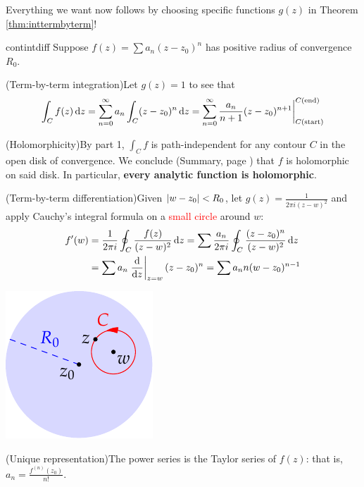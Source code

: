 \goodbreak


Everything we want now follows by choosing specific functions $g(z)$ in Theorem \ref{thm:inttermbyterm}!

\begin{cor}{}{contintdiff}
	Suppose $f(z)=\sum a_n(z-z_0)^n$ has positive radius of convergence $R_0$.
	\begin{enumerate}\itemsep0pt
	  \item (Term-by-term integration)\quad Let $g(z)=1$ to see that
	  \[
	  	\int_Cf(z)\,{\mathrm{d} z}=\sum_{n=0}^\infty a_n\int_C (z-z_0)^n\,{\mathrm{d} z} =\sum_{n=0}^\infty\frac{a_n}{n+1}(z-z_0)^{n+1}\bigg|_{C(\text{start})}^{C(\text{end})}
	  \]
	  
	  \item (Holomorphicity)\quad By part 1, $\int_Cf$ is path-independent for any contour $C$ in the open disk of convergence. We conclude (Summary, page \pageref{pg:ftcsummary}) that $f$ is holomorphic on said disk. In particular, \textbf{every analytic function is holomorphic}.
	  
		\begin{minipage}[t]{0.78\linewidth}\vspace{0pt}
		  \item (Term-by-term differentiation)\quad Given $\left| w-z_0\right|<R_0$, let $g(z)=\frac 1{2\pi i(z-w)^2}$ and apply Cauchy's integral formula on a \textcolor{red}{small circle} around $w$:
		  \begin{align*}
		  	f'(w)&=\frac 1{2\pi i}\oint_C\frac{f(z)}{(z-w)^2}\,{\mathrm{d} z} 
		  		=\sum \frac{a_n}{2\pi i}\oint_C\frac{(z-z_0)^n}{(z-w)^2}\,{\mathrm{d} z}\\
		  	&=\sum a_n\left.\frac{\mathrm{d} }{\mathrm{d} z}\right|_{z=w}(z-z_0)^n 
		  		=\sum a_nn(w-z_0)^{n-1}
		  \end{align*}
		\end{minipage}
		\hfill
		\begin{minipage}[t]{0.21\linewidth}\vspace{-5pt}
			\flushright\includegraphics[scale=0.95]{diff}
		\end{minipage}
		
		\item\label{thm:contintdiff4} (Unique representation)\quad The power series is the Taylor series of $f(z)$: that is, $a_n=\frac{f^{(n)}(z_0)}{n!}$.
	\end{enumerate}
\end{cor}

